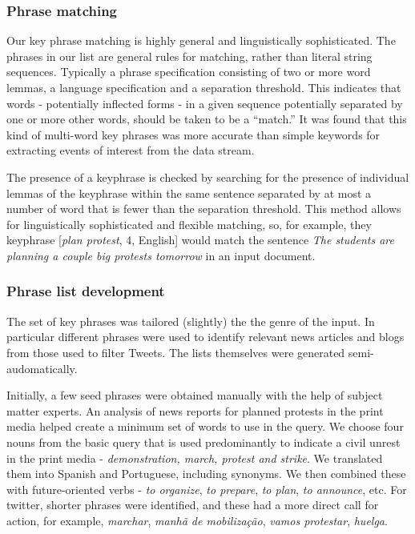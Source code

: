 \subsubsection{Phrase matching}

Our key phrase matching is highly general and linguistically
sophisticated.  The phrases in our list are general rules for
matching, rather than literal string sequences. Typically a phrase
specification consisting of two or more word lemmas, a language
specification and a separation threshold. This indicates that words -
potentially inflected forms - in a given sequence potentially
separated by one or more other words, should be taken to be a
``match.''   It was found that this kind of
multi-word key phrases was more accurate than simple keywords for
extracting events of interest from the data stream.

The presence of a keyphrase is checked by searching for the presence of
individual lemmas of the keyphrase within the same sentence separated
by at most a number of word that is fewer than the separation threshold.  
This method allows for linguistically sophisticated and flexible matching, so, for example,
they keyphrase [{\em plan protest}, 4, English] would match the sentence
{\em The students are planning a couple big protests tomorrow} in an input document.


\subsubsection{Phrase list development}
\label{sec:phraselearning}

The set of key phrases was tailored (slightly) the the genre of the
input. In particular different phrases were used to identify relevant
news articles and blogs from those used to filter Tweets.  The lists
themselves were generated semi-audomatically.

Initially, a few seed phrases were obtained manually
with the help of subject matter experts.
An analysis of news reports for planned protests in the print media helped create a
minimum set of words to use in the query.  We choose four nouns from
the basic query that is used predominantly to indicate a civil unrest
in the print media - {\em demonstration, march, protest and
  strike}. We translated them into Spanish and Portuguese, including
synonyms.  We then combined these with future-oriented verbs - {\em to organize}, {\em to prepare}, {\em to
plan}, {\em to announce}, etc. For twitter, shorter phrases were identified, and these had
a more direct call for action, for example, {\em marchar}, {\em manhã de mobilização}, {\em
  vamos protestar}, {\em huelga}.

